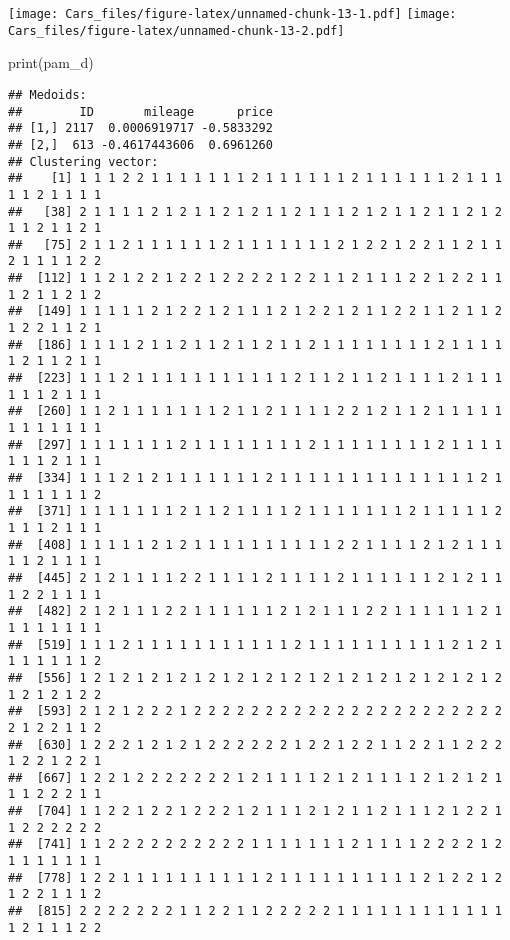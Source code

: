 \documentclass[
]{article}
\newenvironment{Shaded}{\begin{snugshade}}{\end{snugshade}}
\newcommand{\FunctionTok}[1]{\textcolor[rgb]{0.00,0.00,0.00}{#1}}
\newcommand{\NormalTok}[1]{#1}
\begin{document}
\texttt{[image: Cars\_files/figure-latex/unnamed-chunk-13-1.pdf]}
\texttt{[image: Cars\_files/figure-latex/unnamed-chunk-13-2.pdf]}

\begin{Shaded}
\begin{Highlighting}[]
\FunctionTok{print}\NormalTok{(pam\_d)}
\end{Highlighting}
\end{Shaded}

\begin{verbatim}
## Medoids:
##        ID       mileage      price
## [1,] 2117  0.0006919717 -0.5833292
## [2,]  613 -0.4617443606  0.6961260
## Clustering vector:
##    [1] 1 1 1 2 2 1 1 1 1 1 1 1 2 1 1 1 1 1 1 2 1 1 1 1 1 1 2 1 1 1 1 1 2 1 1 1 1
##   [38] 2 1 1 1 1 2 1 2 1 1 2 1 2 1 1 2 1 1 1 2 1 2 1 1 2 1 1 2 1 2 1 1 2 1 1 2 1
##   [75] 2 1 1 2 1 1 1 1 1 1 2 1 1 1 1 1 1 1 2 1 2 2 1 2 2 1 1 2 1 1 2 1 1 1 1 2 2
##  [112] 1 1 2 1 2 2 1 2 2 1 2 2 2 2 1 2 2 1 1 2 1 1 1 2 2 1 2 2 1 1 1 2 1 1 2 1 2
##  [149] 1 1 1 1 1 2 1 2 2 1 2 1 1 1 2 1 2 2 1 2 1 1 2 2 1 1 2 1 1 2 1 2 2 1 1 2 1
##  [186] 1 1 1 1 2 1 1 2 1 1 2 1 1 2 1 1 2 1 1 1 1 1 1 1 1 2 1 1 1 1 1 2 1 1 2 1 1
##  [223] 1 1 1 2 1 1 1 1 1 1 1 1 1 1 1 2 1 1 2 1 1 2 1 1 1 1 2 1 1 1 1 1 1 2 1 1 1
##  [260] 1 1 2 1 1 1 1 1 1 1 2 1 1 2 1 1 1 1 2 2 1 2 1 1 2 1 1 1 1 1 1 1 1 1 1 1 1
##  [297] 1 1 1 1 1 1 1 2 1 1 1 1 1 1 1 1 2 1 1 1 1 1 1 1 1 2 1 1 1 1 1 1 1 2 1 1 1
##  [334] 1 1 1 2 1 2 1 1 1 1 1 1 1 2 1 1 1 1 1 1 1 1 1 1 1 1 1 1 2 1 1 1 1 1 1 1 2
##  [371] 1 1 1 1 1 1 1 2 1 1 2 1 1 1 1 2 1 1 1 1 1 1 1 2 1 1 1 1 1 2 1 1 1 2 1 1 1
##  [408] 1 1 1 1 1 2 1 2 1 1 1 1 1 1 1 1 1 1 2 2 1 1 1 1 2 1 2 1 1 1 1 1 2 1 1 1 1
##  [445] 2 1 2 1 1 1 1 2 2 1 1 1 1 2 1 1 1 1 2 1 1 1 1 1 1 2 1 2 1 1 1 2 2 1 1 1 1
##  [482] 2 1 2 1 1 1 2 2 1 1 1 1 1 1 2 1 2 1 1 1 2 2 1 1 1 1 1 1 2 1 1 1 1 1 1 1 1
##  [519] 1 1 1 2 1 1 1 1 1 1 1 1 1 1 1 2 1 1 1 1 1 1 1 1 1 1 2 1 2 1 1 1 1 1 1 1 2
##  [556] 1 2 1 2 1 2 1 2 1 2 1 2 1 2 1 2 1 2 1 2 1 2 1 2 1 2 1 2 1 2 1 2 1 2 1 2 2
##  [593] 2 1 2 1 2 2 2 1 2 2 2 2 2 2 2 2 2 2 2 2 2 2 2 2 2 2 2 2 2 2 2 1 2 2 1 1 2
##  [630] 1 2 2 2 1 2 1 2 1 2 2 2 2 2 2 1 2 2 1 2 2 1 1 2 2 1 1 2 2 2 1 2 2 1 2 2 1
##  [667] 1 2 2 1 2 2 2 2 2 2 2 1 2 1 1 1 1 2 1 2 1 1 1 1 2 1 2 1 2 1 1 1 2 2 2 1 1
##  [704] 1 1 2 2 1 2 2 1 2 2 2 1 2 1 1 1 2 1 2 1 1 2 1 1 1 2 1 2 2 1 1 2 2 2 2 2 2
##  [741] 1 1 2 2 2 2 2 2 2 2 2 2 1 1 1 1 1 1 1 2 1 1 1 1 2 2 2 2 1 2 1 1 1 1 1 1 1
##  [778] 1 2 2 1 1 1 1 1 1 1 1 1 1 2 1 1 1 1 1 1 1 1 1 1 2 1 2 2 1 2 1 2 2 1 1 1 2
##  [815] 2 2 2 2 2 2 2 1 1 2 2 1 1 2 2 2 2 2 1 1 1 1 1 1 1 1 1 1 1 1 1 2 1 1 1 2 2

\end{verbatim}
\end{document}
